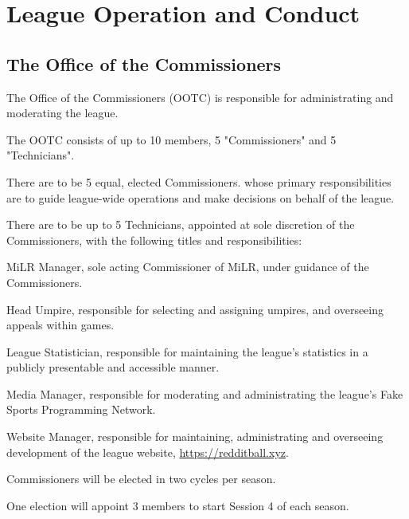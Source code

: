 
\section{League Operation and Conduct}

\subsection{The Office of the Commissioners}
\begin{deepEnumerate}
	\item The Office of the Commissioners (OOTC) is responsible for administrating and moderating the league.
	\item The OOTC consists of up to 10 members, 5 "Commissioners" and 5 "Technicians".
	\begin{deepEnumerate}
		\item There are to be 5 equal, elected Commissioners.
		whose primary responsibilities are to guide league-wide operations 
		and make decisions on behalf of the league.
		\item There are to be up to 5 Technicians, 
		appointed at sole discretion of the Commissioners, 
		with the following titles and responsibilities:
		\begin{deepEnumerate}
			\item MiLR Manager, 
			sole acting Commissioner of MiLR, 
			under guidance of the Commissioners.
			\item Head Umpire, 
			responsible for selecting and assigning umpires, 
			and overseeing appeals within games.
			\item League Statistician, 
			responsible for maintaining the league's statistics 
			in a publicly presentable and accessible manner.
			\item Media Manager, 
			responsible for moderating and administrating 
			the league's Fake Sports Programming Network.
			\item Website Manager, 
			responsible for maintaining, administrating and overseeing development 
			of the league website, \url{https://redditball.xyz}.
		\end{deepEnumerate}
	\end{deepEnumerate}
	\item Commissioners will be elected in two cycles per season.
	\begin{deepEnumerate}
		\item One election will appoint 3 members to start Session 4 of each season.

\end{deepEnumerate}
\end{deepEnumerate}
